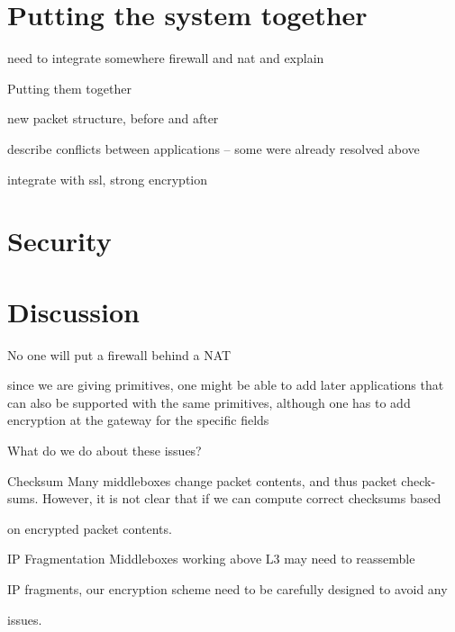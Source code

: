 \section{Putting the system together}\label{sec:all}

need to integrate somewhere firewall and nat and explain

Putting them together

new packet structure, before and after

describe conflicts between applications -- some were already resolved above 

integrate with ssl, strong encryption



\section{Security}

\section{Discussion}

No one will put a firewall behind a NAT

since we are giving primitives, one might be able to add later applications that can also be supported with the same primitives, although one has to add encryption at the gateway for the specific fields 

What do we do about these issues?

Checksum Many middleboxes change packet contents, and thus packet check-
sums. However, it is not clear that if we can compute correct checksums based

on encrypted packet contents.

IP Fragmentation Middleboxes working above L3 may need to reassemble

IP fragments, our encryption scheme need to be carefully designed to avoid any

issues.